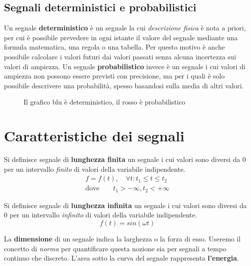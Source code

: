 \documentclass[a4paper, titlepage, oneside]{scrbook}
\begin{document}
\subsection{Segnali deterministici e probabilistici}
Un segnale \textbf{deterministico} è un segnale la cui \textit{descrizione fisica} è nota a priori, per cui è possibile prevedere in ogni istante il valore del segnale mediante una formula matematica, una regola o una tabella. Per questo motivo è anche possibile calcolare i valori futuri dai valori passati senza alcuna incertezza sui valori di ampiezza.
Un segnale \textbf{probabilistico} invece è un segnale i cui valori di ampiezza non possono essere previsti con precisione, ma per i quali è solo possibile descrivere una probabilità, spesso basandosi sulla media di altri valori.
\begin{figure}[h]
	\centering
	\caption{Il grafico blu è deterministico, il rosso è probabilistico}
	\label{fig:deterministico_vs_probabilistico}
\end{figure}

\section{Caratteristiche dei segnali}
Si definisce segnale di \textbf{lunghezza finita} un segnale i cui valori sono diversi da $0$ per un intervallo \textit{finito} di valori della variabile indipendente.
\begin{align*}
	f=f(t), \quad \forall t:t_{1} \leq t \leq t_{2}\\
	\text{dove} \qquad t_{1} > -\infty, t_{2} < +\infty
\end{align*}

Si definisce segnale di \textbf{lunghezza infinita} un segnale i cui valori sono diversi da $0$ per un intervallo \textit{infinito} di valori della variabile indipendente.
$$
	f(t)=sin(\omega t)
$$

La \textbf{dimensione} di un segnale indica la larghezza o la forza di esso. Useremo il concetto di \textit{norma} per quantificare questa nozione sia per segnali a tempo continuo che discreto. L'area sotto la curva del segnale rappresenta \textbf{l'energia}.
\end{document}
